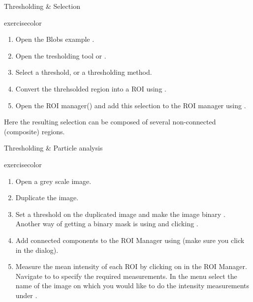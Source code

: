\documentclass[ignorenonframetext,aspectratio=169,10pt,xcolor=table]{beamer}
\begin{document}
\begin{frame}{Thresholding \& Selection}
  \begin{beamercolorbox}[rounded=true, shadow=true, wd=\textwidth, sep=-1em]{exercisecolor}%
    \begin{enumerate}
      \item Open the Blobs example .
      \item Open the tresholding tool  or .
      \item Select a threshold, or a thresholding method.
      \item Convert the threhsolded region into a ROI using .
      \item Open the ROI manager() and add this selection to the ROI manager using .
    \end{enumerate}
    Here the resulting selection can be composed of several non-connected (composite) regions.
  \end{beamercolorbox}
\end{frame}

\begin{frame}{Thresholding \& Particle analysis}
  \begin{beamercolorbox}[rounded=true, shadow=true, wd=\textwidth, sep=-1em]{exercisecolor}%
    \begin{enumerate}
      \item Open a grey scale image.
      \item Duplicate the image.
      \item Set a threshold on the duplicated image and make the image binary . Another way of getting a binary mask is using  and clicking .
      \item Add connected components to the ROI Manager using  (make sure you click  in the  dialog).
      \item Measure the mean intensity of each ROI by clicking on  in the ROI Manager. Navigate to  to specify the required measurements. In the  menu select the name of the image on which you would like to do the intensity measurements under .
    \end{enumerate}
  \end{beamercolorbox}
\end{frame}
\end{document}
